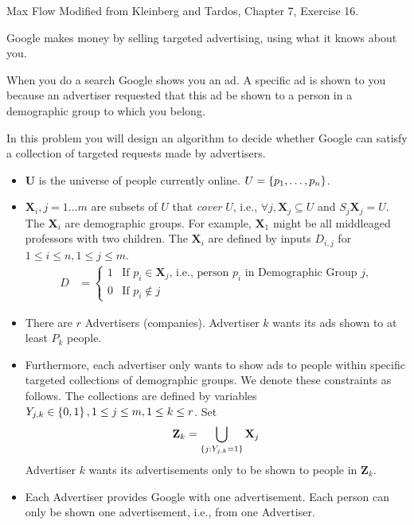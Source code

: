 \documentclass{article}
\numberwithin{table}{section}
\numberwithin{figure}{section}
\begin{document}
\newpage
\begin{section}{Max Flow}
Modified from Kleinberg and Tardos, Chapter 7, Exercise 16.

Google makes money by selling targeted advertising, using what it knows about you.

When you do a search Google shows you an ad. A specific ad is shown to you because an advertiser requested that this ad be shown to a person in a demographic group to which you belong.

In this problem you will design an algorithm to decide whether Google can satisfy a collection of targeted requests made by advertisers.

\begin{itemize}
    \item $\mathbf{U}$ is the universe of people currently online. $U = \left\{p_1, \dots , p_n\right\}$.
    \item $\mathbf{X}_i, j = 1 \dots m$ are subsets of $U$ that \textit{cover} $U$, i.e., $\forall j, \mathbf{X}_j \subseteq U$ and
    $S_j \mathbf{X}_j = U$.
    The $\mathbf{X}_i$ are demographic groups. For example, $\mathbf{X}_1$ might be all middleaged professors with two children. The $\mathbf{X}_i$ are defined by inputs $D_{i,j}$
    for $1 \leq i \leq n, 1 \leq j \leq m$.
    \begin{align*}
        D &=
        \begin{cases}
            1 & \text{If $p_i \in \mathbf{X}_j$, i.e., person $p_i$ in Demographic Group $j$,} \\
            0 & \text{If $p_i \notin j$}
        \end{cases}
    \end{align*}
    \item There are $r$ Advertisers (companies). Advertiser $k$ wants its ads shown to at least $P_k$ people.
    \item Furthermore, each advertiser only wants to show ads to people within specific targeted collections of demographic groups. We denote these constraints as follows. The collections are defined by variables $Y_{j,k} \in \left\{0,1\right\}, 1 \leq j \leq m, 1 \leq k \leq r$. Set
    \begin{align*}
        \mathbf{Z}_k = \bigcup_{\left\{j:Y_{j,k}=1\right\}} \mathbf{X}_j
    \end{align*}
    Advertiser $k$ wants its advertisements only to be shown to people in $\mathbf{Z}_k$.
    \item Each Advertiser provides Google with one advertisement. Each person can only be shown one advertisement, i.e., from one Advertiser.
\end{itemize}


\end{section}
\end{document}
